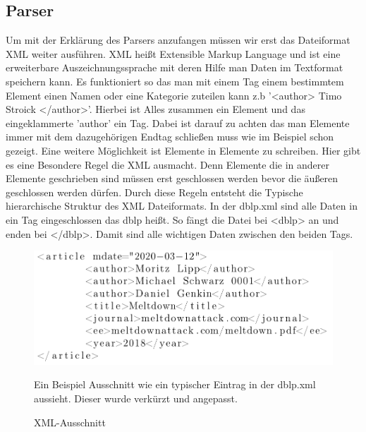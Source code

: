 \subsection{Parser}
Um mit der Erklärung des Parsers anzufangen müssen wir erst das Dateiformat XML weiter ausführen. XML heißt Extensible Markup Language und ist eine erweiterbare Auszeichnungssprache mit deren Hilfe man Daten im Textformat speichern kann. Es funktioniert so das man mit einem Tag einem bestimmtem Element einen Namen oder eine Kategorie zuteilen kann z.b '<author> Timo Stroick </author>'. Hierbei ist Alles zusammen ein Element und das eingeklammerte 'author' ein Tag. Dabei ist darauf zu achten das man Elemente immer mit dem dazugehörigen Endtag schließen muss wie im Beispiel schon gezeigt. Eine weitere Möglichkeit ist Elemente in Elemente zu schreiben. Hier gibt es eine Besondere Regel die XML ausmacht. Denn Elemente die in anderer Elemente geschrieben sind müssen erst geschlossen werden bevor die äußeren geschlossen werden dürfen. Durch diese Regeln entsteht die Typische hierarchische Struktur des XML Dateiformats. In der dblp.xml sind alle Daten in ein Tag eingeschlossen das dblp heißt. So fängt die Datei bei <dblp> an und enden bei </dblp>. Damit sind alle wichtigen Daten zwischen den beiden Tags. 
\begin{figure}[!htb]
	\centering
	\includegraphics[width=14cm,keepaspectratio]{bilder/xmlAusschnitt}
	\caption{XML-Ausschnitt}
	Ein Beispiel Ausschnitt wie ein typischer Eintrag in der dblp.xml aussieht. Dieser wurde verkürzt und angepasst.
\end{figure}

